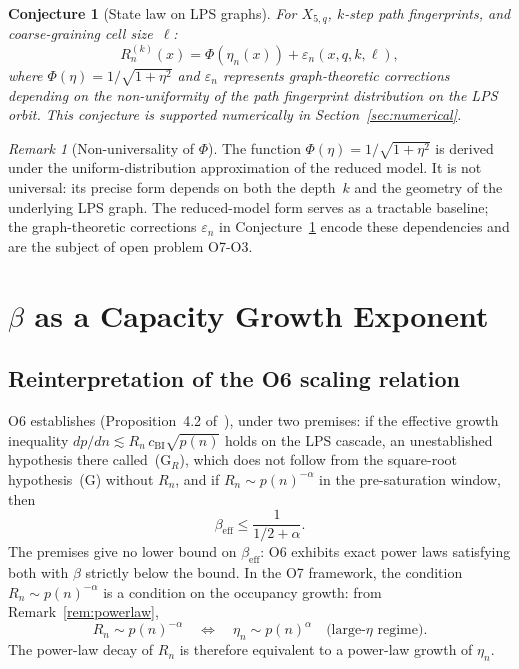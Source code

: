 \documentclass[11pt,a4paper]{article}
\newtheorem{conjecture}[theorem]{Conjecture}
\theoremstyle{definition}
\theoremstyle{remark}
\newtheorem{remark}[theorem]{Remark}
\newcommand{\beff}{\beta_{\mathrm{eff}}}
\begin{document}
    \begin{conjecture}[State law on LPS graphs]
      \label{conj:statelaw-LPS}
      For $X_{5,q}$, $k$-step path fingerprints, and coarse-graining cell size~$\ell$:
      \begin{equation}
        \label{eq:conj-statelaw}
        R_n^{(k)}(x) = \Phi(\eta_n(x)) + \varepsilon_n(x,q,k,\ell),
      \end{equation}
      where $\Phi(\eta) = 1/\sqrt{1+\eta^2}$ and $\varepsilon_n$ represents graph-theoretic corrections
      depending on the non-uniformity of the path fingerprint distribution on the LPS orbit.
      This conjecture is supported numerically in Section~\ref{sec:numerical}.
    \end{conjecture}

    \begin{remark}[Non-universality of $\Phi$]
      \label{rem:phi-nonuniversal}
      The function $\Phi(\eta) = 1/\sqrt{1+\eta^2}$ is derived under the uniform-distribution
      approximation of the reduced model.
      It is not universal: its precise form depends on both the depth~$k$ and the geometry of the
      underlying LPS graph.
      The reduced-model form serves as a tractable baseline; the graph-theoretic corrections
      $\varepsilon_n$ in Conjecture~\ref{conj:statelaw-LPS} encode these dependencies and are
      the subject of open problem O7-O3.
    \end{remark}

  \section{$\beta$ as a Capacity Growth Exponent}
  \label{sec:beta}

  \subsection{Reinterpretation of the O6 scaling relation}
    \label{ssec:reinterp}

    O6 establishes (Proposition~4.2 of~\cite{Beau2026a10}), under two premises: if the effective
    growth inequality $dp/dn \lesssim R_n\, c_{\mathrm{BI}}\sqrt{p(n)}$ holds on the LPS cascade, an
    unestablished hypothesis there called~(G$_R$), which does not follow from the square-root
    hypothesis~(G) without $R_n$, and if $R_n \sim p(n)^{-\alpha}$ in the pre-saturation window, then
    \begin{equation}
      \label{eq:beff}
      \beff \leq \frac{1}{1/2+\alpha}.
    \end{equation}
    The premises give no lower bound on $\beff$: O6 exhibits exact power laws satisfying both with
    $\beta$ strictly below the bound.
    In the O7 framework, the condition $R_n \sim p(n)^{-\alpha}$ is a condition on the occupancy
    growth: from Remark~\ref{rem:powerlaw},
    \begin{equation}
      \label{eq:eta-growth}
      R_n \sim p(n)^{-\alpha}
      \quad \Leftrightarrow \quad
      \eta_n \sim p(n)^\alpha
      \quad \text{(large-}\eta\text{ regime)}.
    \end{equation}
    The power-law decay of $R_n$ is therefore equivalent to a power-law growth of $\eta_n$.
\end{document}
